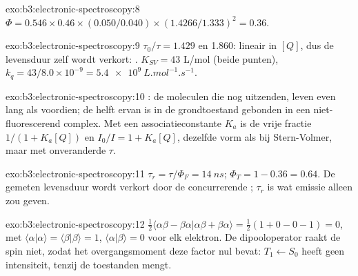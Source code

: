 \begin{solution}{exo:b3:electronic-spectroscopy:8}
$\Phi = 0.546 \times 0.46 \times (0.050/0.040) \times (1.4266/1.333)^2 = 0.36$.
\end{solution}

\begin{solution}{exo:b3:electronic-spectroscopy:9}
$\tau_0/\tau = 1.429$ en 1.860: lineair in $[Q]$, dus de levensduur zelf
wordt verkort: . $K_{SV} = 43$ L/mol (beide punten), $k_q = 43/8.0
\times 10^{-9} = \qty{5.4e9}{L.mol^{-1}.s^{-1}}$.
\end{solution}

\begin{solution}{exo:b3:electronic-spectroscopy:10}
: de moleculen die nog uitzenden, leven even lang als
voordien; de helft ervan is in de grondtoestand gebonden in een
niet-fluorescerend complex. Met een
associatieconstante $K_a$ is de vrije fractie $1/(1 + K_a[Q])$ en $I_0/I = 1 +
K_a[Q]$, dezelfde vorm als bij Stern-Volmer, maar met onveranderde $\tau$.
\end{solution}

\begin{solution}{exo:b3:electronic-spectroscopy:11}
$\tau_r = \tau/\Phi_F = \qty{14}{ns}$; $\Phi_T = 1 - 0.36 = 0.64$. De gemeten
levensduur wordt verkort door de concurrerende ;
$\tau_r$ is wat emissie alleen zou geven.
\end{solution}

\begin{solution}{exo:b3:electronic-spectroscopy:12}
$\frac12\langle\alpha\beta - \beta\alpha|\alpha\beta + \beta\alpha\rangle = \frac12(1 + 0 - 0 - 1) = 0$, met
$\langle\alpha|\alpha\rangle = \langle\beta|\beta\rangle = 1$, $\langle\alpha|\beta\rangle = 0$ voor elk elektron.
De dipooloperator raakt de spin niet, zodat het overgangsmoment deze
factor nul bevat: $T_1 \leftarrow S_0$ heeft geen intensiteit, tenzij
de toestanden mengt.
\end{solution}

